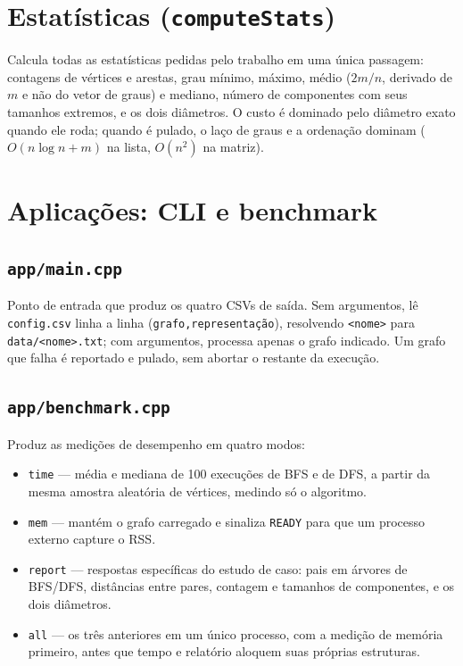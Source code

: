 \documentclass[a4paper,11pt]{article}
\begin{document}
\section{Estatísticas (\texttt{computeStats})}

Calcula todas as estatísticas pedidas pelo trabalho em uma única
passagem: contagens de vértices e arestas, grau mínimo, máximo, médio
($2m/n$, derivado de $m$ e não do vetor de graus) e mediano, número de
componentes com seus tamanhos extremos, e os dois diâmetros. O custo é
dominado pelo diâmetro exato quando ele roda; quando é pulado, o laço de
graus e a ordenação dominam ($O(n\log n + m)$ na lista, $O(n^2)$ na
matriz).

\section{Aplicações: CLI e benchmark}

\subsection{\texttt{app/main.cpp}}

Ponto de entrada que produz os quatro CSVs de saída. Sem argumentos, lê
\texttt{config.csv} linha a linha (\texttt{grafo,representação}),
resolvendo \texttt{<nome>} para \texttt{data/<nome>.txt}; com argumentos,
processa apenas o grafo indicado. Um grafo que falha é reportado e
pulado, sem abortar o restante da execução.

\subsection{\texttt{app/benchmark.cpp}}

Produz as medições de desempenho em quatro modos:

\begin{itemize}
    \item \texttt{time} --- média e mediana de 100 execuções de BFS e de
    DFS, a partir da mesma amostra aleatória de vértices, medindo só o
    algoritmo.
    \item \texttt{mem} --- mantém o grafo carregado e sinaliza
    \texttt{READY} para que um processo externo capture o RSS.
    \item \texttt{report} --- respostas específicas do estudo de caso:
    pais em árvores de BFS/DFS, distâncias entre pares, contagem e
    tamanhos de componentes, e os dois diâmetros.
    \item \texttt{all} --- os três anteriores em um único processo, com
    a medição de memória primeiro, antes que tempo e relatório aloquem
    suas próprias estruturas.
\end{itemize}
\end{document}
